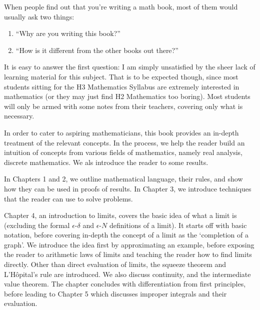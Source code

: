\newenvironment{preface}{
    \vspace*{\stretch{2}}
    {\noindent \bfseries \Huge \prefacename}
    \begin{center}
        \phantomsection \addcontentsline{toc}{chapter}{\prefacename} %
        \thispagestyle{plain}
    \end{center}
}
{\vspace*{\stretch{5}}}

\begin{preface}
    When people find out that you're writing a math book, most of them would usually ask
    two things:
    \begin{enumerate}
        \item ``Why are you writing this book?''
        \item ``How is it different from the other books out there?''
    \end{enumerate}
    It is easy to answer the first question: I am simply unsatisfied by the sheer lack of learning material
    for this subject. That is to be expected though, since most students sitting for the H3 Mathematics Syllabus
    are extremely interested in mathematics (or they may just find H2 Mathematics too boring).
    Most students will only be armed with some notes from their teachers, covering only what is necessary.

    In order to cater to aspiring mathematicians, this book provides an in-depth treatment of the relevant concepts.
    In the process, we help the reader build an intuition of concepts from various fields of mathematics, namely
    real analysis, discrete mathematics. We als introduce the reader to some results.

    In Chapters 1 and 2, we outline mathematical language, their rules, and show how they can be used
    in proofs of results. In Chapter 3, we introduce techniques that the reader can use to solve problems.

    Chapter 4, an introduction to limits, covers the basic idea of what a limit is (excluding the
    formal $\epsilon$-$\delta$ and $\epsilon$-$N$ definitions of a limit). It starts off with basic notation,
    before covering in-depth the concept of a limit as the `completion of a graph'. We introduce the idea
    first by approximating an example, before exposing the reader to arithmetic laws of limits and teaching
    the reader how to find limits directly. Other than direct evaluation of limits, the squeeze theorem and
    L'H\^{o}pital's rule are introduced.
    We also discuss continuity, and the intermediate value theorem.
    The chapter concludes with differentiation from first principles,
    before leading to Chapter 5 which discusses improper integrals and their evaluation.


\end{preface}
